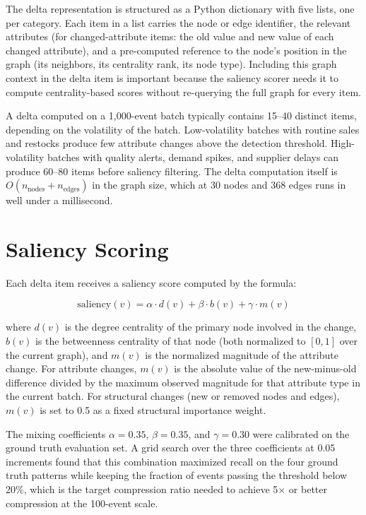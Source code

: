 The delta representation is structured as a Python dictionary with five lists, one per
category. Each item in a list carries the node or edge identifier, the relevant attributes
(for changed-attribute items: the old value and new value of each changed attribute), and
a pre-computed reference to the node's position in the graph (its neighbors, its centrality
rank, its node type). Including this graph context in the delta item is important because
the saliency scorer needs it to compute centrality-based scores without re-querying the
full graph for every item.

A delta computed on a 1,000-event batch typically contains 15--40 distinct items, depending
on the volatility of the batch. Low-volatility batches with routine sales and restocks
produce few attribute changes above the detection threshold. High-volatility batches with
quality alerts, demand spikes, and supplier delays can produce 60--80 items before saliency
filtering. The delta computation itself is $O(n_{\text{nodes}} + n_{\text{edges}})$ in the
graph size, which at 30 nodes and 368 edges runs in well under a millisecond.

\section{Saliency Scoring}
\label{sec:saliency_scoring}

Each delta item receives a saliency score computed by the formula:

\begin{equation}
\text{saliency}(v) = \alpha \cdot d(v) + \beta \cdot b(v) + \gamma \cdot m(v)
\label{eq:saliency}
\end{equation}

where $d(v)$ is the degree centrality of the primary node involved in the change,
$b(v)$ is the betweenness centrality of that node (both normalized to $[0, 1]$ over
the current graph), and $m(v)$ is the normalized magnitude of the attribute change.
For attribute changes, $m(v)$ is the absolute value of the new-minus-old difference
divided by the maximum observed magnitude for that attribute type in the current batch.
For structural changes (new or removed nodes and edges), $m(v)$ is set to 0.5 as a
fixed structural importance weight.

The mixing coefficients $\alpha = 0.35$, $\beta = 0.35$, and $\gamma = 0.30$ were
calibrated on the ground truth evaluation set. A grid search over the three coefficients
at 0.05 increments found that this combination maximized recall on the four ground truth
patterns while keeping the fraction of events passing the threshold below 20\%, which
is the target compression ratio needed to achieve 5$\times$ or better compression at
the 100-event scale.


